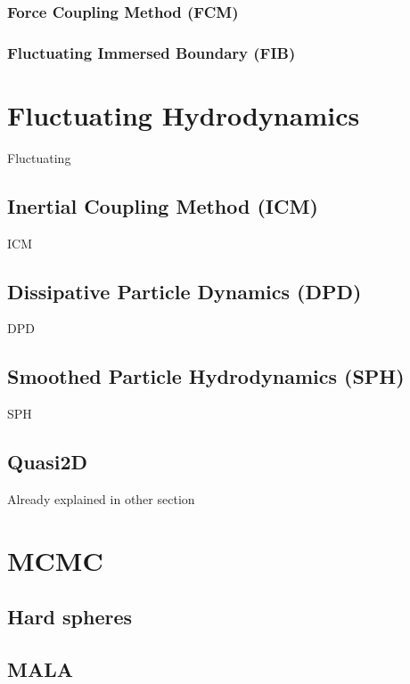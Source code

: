 \documentclass[ twoside,openright,titlepage,numbers=noenddot,%
headinclude,footinclude,cleardoublepage=empty,abstract=on,
BCOR=5mm,paper=a4,fontsize=11pt
]{scrreprt}
\begin{document}
\subsection{Force Coupling Method (FCM)}

\subsection{Fluctuating Immersed Boundary (FIB)}

\chapter{Fluctuating Hydrodynamics}

Fluctuating

\section{Inertial Coupling Method (ICM)}

ICM

\section{Dissipative Particle Dynamics (DPD)}

DPD

\section{Smoothed Particle Hydrodynamics (SPH)}


SPH

\section{Quasi2D}

Already explained in other section

\chapter{MCMC}

\section{Hard spheres}

\section{MALA}
\end{document}
